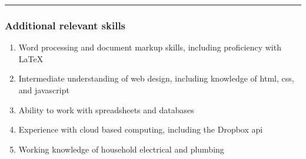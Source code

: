 \documentclass[10pt]{article}
\begin{document}
\hrule

\subsubsection*{Additional relevant skills}

\begin{enumerate}[$\blacktriangleright$]
  \item Word processing and document markup skills, including proficiency with \LaTeX
  \item Intermediate understanding of web design, including knowledge of html, css, and javascript
  \item Ability to work with spreadsheets and databases
  \item Experience with cloud based computing, including the Dropbox api
  \item Working knowledge of household electrical and plumbing 
\end{enumerate}
\end{document}
